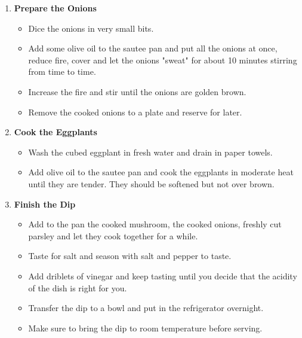 \documentclass[11pt,letterpaper]{article}
\newcommand \fileName {EggplantDip}
\begin{document}
\begin {description}
\begin{enumerate}
\item {\bf Prepare the Onions}
\begin{itemize}
\item Dice the onions in very small bits.
\item Add some olive oil to the sautee pan and put all the onions at once, reduce fire,
  cover and let the onions "sweat" for about 10 minutes stirring from
  time to time. 
\item Increase the fire and stir until the onions are golden brown. 
\item Remove the cooked onions to a plate and reserve for later.
\end{itemize}

\item {\bf Cook the Eggplants}
\begin{itemize}
\item Wash the cubed eggplant in fresh water and drain in paper towels.
\item  Add olive oil to the sautee pan and cook the eggplants in moderate
  heat until they are tender. They should be softened but not over brown.
\end{itemize}

\item{\bf Finish the Dip}
\begin{itemize}
\item Add to the pan the cooked mushroom, the cooked onions, freshly
  cut parsley and let they cook together for a while.
\item Taste for salt and season with salt and
  pepper to taste. 
\item Add driblets of vinegar and keep tasting until
  you decide that the acidity of the dish is right for you.
\item Transfer the dip to a bowl and put in the refrigerator overnight.
\item Make sure to bring the dip to room temperature before serving.
\end{itemize}

\end{enumerate}
\end{description}

%
\end{document}
